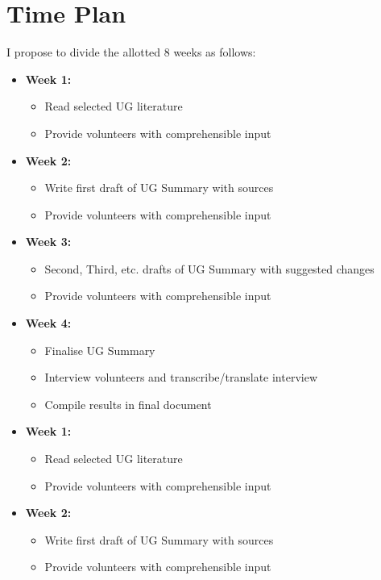 \documentclass[a4paper,10pt]{article}
\begin{document}
\section{Time Plan}
I propose to divide the allotted 8 weeks as follows:
\begin{itemize}
    \item \textbf{Week 1:}
        \begin{itemize}
        \item Read selected UG literature
        \item Provide volunteers with comprehensible input
        \end{itemize}
    \item \textbf{Week 2:}
        \begin{itemize}
        \item Write first draft of UG Summary with sources
        \item Provide volunteers with comprehensible input
        \end{itemize}
    \item \textbf{Week 3:}
        \begin{itemize}
        \item Second, Third, etc. drafts of UG Summary with suggested changes
        \item Provide volunteers with comprehensible input
        \end{itemize}
    \item \textbf{Week 4:}
        \begin{itemize}
        \item Finalise UG Summary
        \item Interview volunteers and transcribe/translate interview
        \item Compile results in final document
        \end{itemize}
    \item \textbf{Week 1:}
        \begin{itemize}
            \item Read selected UG literature
            \item Provide volunteers with comprehensible input
        \end{itemize}
    \item \textbf{Week 2:}
        \begin{itemize}
            \item Write first draft of UG Summary with sources
            \item Provide volunteers with comprehensible input

\end{itemize}
\end{itemize}
\end{document}
